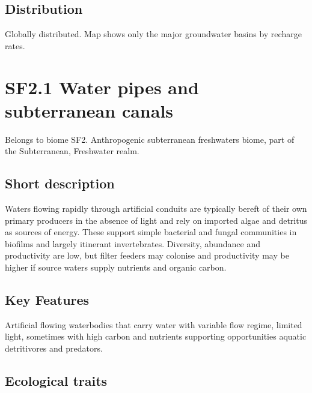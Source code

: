 \documentclass[
  letterpaper,
  DIV=11,
  numbers=noendperiod]{scrartcl}
\begin{document}
\subsection{Distribution}\label{distribution-63}

Globally distributed. Map shows only the major groundwater basins by
recharge rates.

\section{SF2.1 Water pipes and subterranean
canals}\label{sf2.1-water-pipes-and-subterranean-canals}

Belongs to biome SF2. Anthropogenic subterranean freshwaters biome, part
of the Subterranean, Freshwater realm.

\subsection{Short description}\label{short-description-64}

Waters flowing rapidly through artificial conduits are typically bereft
of their own primary producers in the absence of light and rely on
imported algae and detritus as sources of energy. These support simple
bacterial and fungal communities in biofilms and largely itinerant
invertebrates. Diversity, abundance and productivity are low, but filter
feeders may colonise and productivity may be higher if source waters
supply nutrients and organic carbon.

\subsection{Key Features}\label{key-features-64}

Artificial flowing waterbodies that carry water with variable flow
regime, limited light, sometimes with high carbon and nutrients
supporting opportunities aquatic detritivores and predators.

\subsection{Ecological traits}\label{ecological-traits-64}
\end{document}
